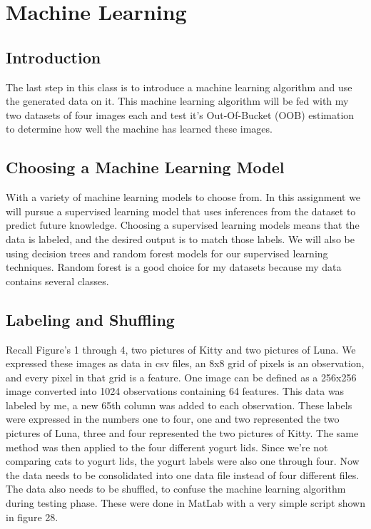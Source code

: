 \documentclass[12pt, letterpaper]{article}
\begin{document}
\section{Machine Learning}

\subsection{Introduction}
The last step in this class is to introduce a machine learning algorithm and use the generated data on it. This machine learning algorithm will be fed with my two datasets of four images each and test it's Out-Of-Bucket (OOB) estimation to determine how well the machine has learned these images.

\subsection{Choosing a Machine Learning Model}
With a variety of machine learning models to choose from. In this assignment we will pursue a supervised learning model that uses inferences from the dataset to predict future knowledge. Choosing a supervised learning models means that the data is labeled, and the desired output is to match those labels. We will also be using decision trees and random forest models for our supervised learning techniques. Random forest is a good choice for my datasets because my data contains several classes.

\subsection{Labeling and Shuffling}
Recall Figure's 1 through 4, two pictures of Kitty and two pictures of Luna. We expressed these images as data in csv files, an 8x8 grid of pixels is an observation, and every pixel in that grid is a feature. One image can be defined as a 256x256 image converted into 1024 observations containing 64 features. This data was labeled by me, a new 65th column was added to each observation. These labels were expressed in the numbers one to four, one and two represented the two pictures of Luna, three and four represented the two pictures of Kitty. The same method was then applied to the four different yogurt lids. Since we're not comparing cats to yogurt lids, the yogurt labels were also one through four. Now the data needs to be consolidated into one data file instead of four different files. The data also needs to be shuffled, to confuse the machine learning algorithm during testing phase. These were done in MatLab with a very simple script shown in figure 28.
\end{document}
